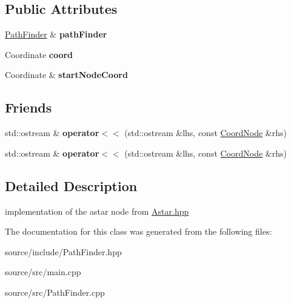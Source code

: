 \subsection*{Public Attributes}
\begin{DoxyCompactItemize}
\item 
\hyperlink{class_path_finder}{Path\+Finder} \& {\bfseries path\+Finder}\hypertarget{class_path_finder_1_1_coord_node_a0a17d6e85b89c889b652e152c32a8d88}{}\label{class_path_finder_1_1_coord_node_a0a17d6e85b89c889b652e152c32a8d88}

\item 
Coordinate {\bfseries coord}\hypertarget{class_path_finder_1_1_coord_node_a26f764d5cf615489615f0d255690d1c7}{}\label{class_path_finder_1_1_coord_node_a26f764d5cf615489615f0d255690d1c7}

\item 
Coordinate \& {\bfseries start\+Node\+Coord}\hypertarget{class_path_finder_1_1_coord_node_a8f2b5ba4b954e7c982d82ea9a83901f1}{}\label{class_path_finder_1_1_coord_node_a8f2b5ba4b954e7c982d82ea9a83901f1}

\end{DoxyCompactItemize}
\subsection*{Friends}
\begin{DoxyCompactItemize}
\item 
std\+::ostream \& {\bfseries operator$<$$<$} (std\+::ostream \&lhs, const \hyperlink{class_path_finder_1_1_coord_node}{Coord\+Node} \&rhs)\hypertarget{class_path_finder_1_1_coord_node_a916d53bc1effb05ba13b22a87cd5bf3d}{}\label{class_path_finder_1_1_coord_node_a916d53bc1effb05ba13b22a87cd5bf3d}

\item 
std\+::ostream \& {\bfseries operator$<$$<$} (std\+::ostream \&lhs, const \hyperlink{class_path_finder_1_1_coord_node}{Coord\+Node} \&rhs)\hypertarget{class_path_finder_1_1_coord_node_a916d53bc1effb05ba13b22a87cd5bf3d}{}\label{class_path_finder_1_1_coord_node_a916d53bc1effb05ba13b22a87cd5bf3d}

\end{DoxyCompactItemize}


\subsection{Detailed Description}
implementation of the astar node from \hyperlink{_astar_8hpp_source}{Astar.\+hpp} 

The documentation for this class was generated from the following files\+:\begin{DoxyCompactItemize}
\item 
source/include/Path\+Finder.\+hpp\item 
source/src/main.\+cpp\item 
source/src/Path\+Finder.\+cpp\end{DoxyCompactItemize}
